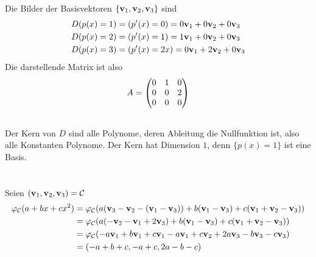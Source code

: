 \documentclass{../mfa}
\begin{document}
\subsection{}

\section{}
\subsection{}
Die Bilder der Basisvektoren $\{\mathbf{v}_{1}, \mathbf{v}_{2}, \mathbf{v}_{3}\}$ sind
\begin{align*}
   D(p(x)=1) &= (p^\prime(x) = 0) = 0\mathbf{v}_{1} + 0\mathbf{v}_{2} + 0\mathbf{v}_{3}\\
   D(p(x)=2) &= (p^\prime(x) = 1) = 1\mathbf{v}_{1} + 0\mathbf{v}_{2} + 0\mathbf{v}_{3}\\
   D(p(x)=3) &= (p^\prime(x) = 2x) = 0\mathbf{v}_{1} + 2\mathbf{v}_{2} + 0\mathbf{v}_{3}\\
\end{align*}
Die darstellende Matrix ist also
\begin{equation*}
   A = \begin{pmatrix}0 & 1 & 0 \\ 0 & 0 & 2 \\ 0 & 0 & 0\end{pmatrix}
\end{equation*}

\subsection{}
Der Kern von $D$ sind alle Polynome, deren Ableitung die Nullfunktion ist, also
alle Konstanten Polynome. Der Kern hat Dimension $1$, denn $\{p(x)=1\}$ ist eine
Basis.

\section{}

Seien $(\mathbf{v}_{1}, \mathbf{v}_{2}, \mathbf{v}_{3}) = \mathcal{C}$
\begin{align*}
   \varphi_\mathcal{C}(a + bx +cx^2) & = \varphi_\mathcal{C}(a(\mathbf{v}_{3} - \mathbf{v}_{2} - (\mathbf{v}_{1} - \mathbf{v}_{3})) + b(\mathbf{v}_{1} - \mathbf{v}_{3}) + c(\mathbf{v}_{1} + \mathbf{v}_{2} - \mathbf{v}_{3})) \\
                                     & = \varphi_\mathcal{C}(a(-\mathbf{v}_{2} - \mathbf{v}_{1} +
   2\mathbf{v}_{3}) + b(\mathbf{v}_{1} - \mathbf{v}_{3}) + c(\mathbf{v}_{1} + \mathbf{v}_{2} - \mathbf{v}_{3})) \\
                                     & = \varphi_\mathcal{C}(-a\mathbf{v}_{1} + b\mathbf{v}_{1} +
   c\mathbf{v}_{1} -a\mathbf{v}_{1} + c\mathbf{v}_{2} + 2a\mathbf{v}_{3} - b\mathbf{v}_{3} - c\mathbf{v}_{3}) \\
                                     & = \left(-a +b +c, -a + c, 2a -b - c\right)
\end{align*}
\end{document}
